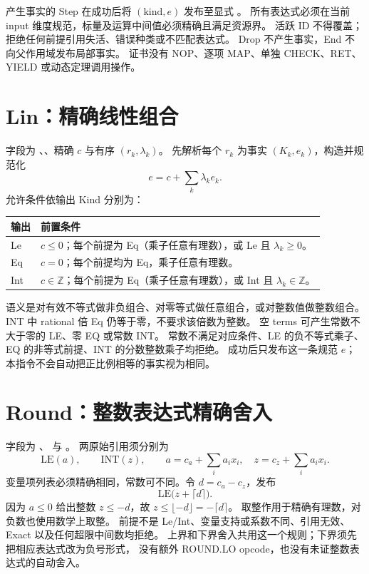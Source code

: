 产生事实的 Step 在成功后将 $(\mathrm{kind},e)$ 发布至显式 。
所有表达式必须在当前 input 维度规范，标量及运算中间值必须精确且满足资源界。
活跃 ID 不得覆盖；拒绝任何前提引用失活、错误种类或不匹配表达式。
Drop 不产生事实，End 不向父作用域发布局部事实。
证书没有 NOP、逐项 MAP、单独 CHECK、RET、YIELD 或动态定理调用操作。

\section{Lin：精确线性组合}
\label{ins:lin}
\label{ins:lin-le}
\label{ins:lin-eq}
\label{ins:int-aff}

字段为 、、精确  $c$ 与有序
 $(r_k,\lambda_k)$。
先解析每个 $r_k$ 为事实 $(K_k,e_k)$，构造并规范化
\[
 e=c+\sum_k\lambda_ke_k.
\]
允许条件依输出 Kind 分别为：
\begin{center}
\begin{tabularx}{\textwidth}{lY}
\toprule
输出 & 前置条件 \\
\midrule
Le & $c\le0$；每个前提为 Eq（乘子任意有理数），或 Le 且 $\lambda_k\ge0$。\\
Eq & $c=0$；每个前提均为 Eq，乘子任意有理数。\\
Int & $c\in\mathbb Z$；每个前提为 Eq（乘子任意有理数），或 Int 且 $\lambda_k\in\mathbb Z$。\\
\bottomrule
\end{tabularx}
\end{center}

语义是对有效不等式做非负组合、对零等式做任意组合，或对整数值做整数组合。
INT 中 rational 倍 Eq 仍等于零，不要求该倍数为整数。
空 terms 可产生常数不大于零的 LE、零 EQ 或常数 INT。
常数不满足对应条件、LE 的负不等式乘子、EQ 的非等式前提、INT 的分数整数乘子均拒绝。
成功后只发布这一条规范 $e$；本指令不会自动把正比例相等的事实视为相同。

\section{Round：整数表达式精确舍入}
\label{ins:round}
\label{ins:round-hi}
\label{ins:round-lo}

字段为 、 与 。
两原始引用须分别为
\[
 \mathrm{LE}(a),\qquad\mathrm{INT}(z),\qquad
 a=c_a+\sum_i a_ix_i,\quad z=c_z+\sum_i a_ix_i.
\]
变量项列表必须精确相同，常数可不同。令 $d=c_a-c_z$，发布
\[
 \mathrm{LE}\bigl(z+\lceil d\rceil\bigr).
\]
因为 $a\le0$ 给出整数 $z\le-d$，故 $z\le\lfloor-d\rfloor=-\lceil d\rceil$。
取整作用于精确有理数，对负数也使用数学上取整。
前提不是 Le/Int、变量支持或系数不同、引用无效、Exact 以及任何超限中间数均拒绝。
上界和下界舍入共用这一个规则；下界须先把相应表达式改为负号形式，
没有额外 ROUND.LO opcode，也没有未证整数表达式的自动舍入。

